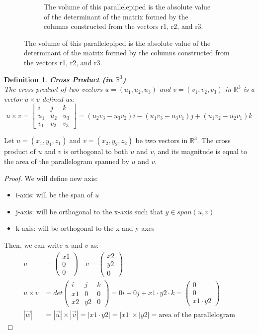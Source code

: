 \documentclass[11pt]{book} %
\newtheorem{definition}{Definition}[section]
\begin{document}
\begin{figure}[H]
\begin{subfigure}{0.4\textwidth}
        \caption{The volume of this parallelepiped is the absolute value of the determinant of the matrix formed by the columns constructed from the vectors r1, r2, and r3.}
    \end{subfigure}
\end{figure}

\begin{definition}{\textbf{Cross Product (in $\mathbb{R}^3$)}} \\
    The cross product of two vectors \( u = (u_1, u_2, u_3) \) and \( v = (v_1, v_2, v_3) \) in \( \mathbb{R}^3 \) is a vector \( u \times v \) defined as:
    \[
    u \times v = \begin{bmatrix} i & j & k \\ u_1 & u_2 & u_3 \\ v_1 & v_2 & v_3 \end{bmatrix} = (u_2 v_3 - u_3 v_2) i - (u_1 v_3 - u_3 v_1) j + (u_1 v_2 - u_2 v_1) k
    \]
\end{definition}

Let \( u = (x_1, y_1, z_1) \) and \( v = (x_2, y_2, z_2) \) be two vectors in \( \mathbb{R}^3 \). 
The cross product of \( u \) and \( v \) is orthogonal to both \( u \) and \( v \), and its magnitude is equal to the area of the parallelogram spanned by \( u \) and \( v \).
\begin{proof}
    We will define new axis: 
    \begin{itemize}
        \item i-axis: will be the span of \( u \)
        \item j-axis: will be orthogonal to the x-axis such that \( y \in span({u, v}) \)
        \item k-axis: will be orthogonal to the x and y axes
    \end{itemize}
    Then, we can write \( u \) and \( v \) as:
    \begin{align*}
        u &= \begin{pmatrix}x1 \\ 0 \\ 0\end{pmatrix} \quad v = \begin{pmatrix}x2 \\ y2 \\ 0\end{pmatrix} \\
        u \times v &= det\begin{pmatrix}i & j & k \\ x1 & 0 & 0 \\ x2 & y2 & 0\end{pmatrix} = 
         0 i - 0 j + x1 \cdot y2 \cdot k = \begin{pmatrix}0 \\ 0 \\ x1 \cdot y2\end{pmatrix} \\
         | \vec{w} | &= | \vec{u} | \times | \vec{v} | = | x1 \cdot y2 | = | x1 | \times | y2 | = \text{area of the parallelogram}
    \end{align*}
\end{proof}
\end{document}
